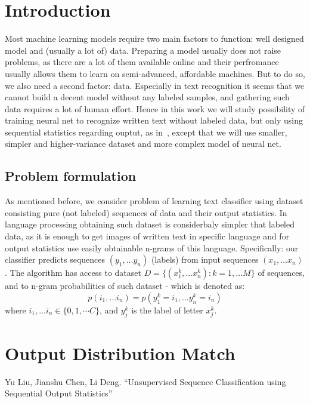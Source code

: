 \documentclass[shortabstract]{iithesis}
\author         {Grzegorz Ciesielski}
\begin{document}

\chapter{Introduction}

Most machine learning models require two main factors to function: well 
designed model and (usually a lot of) data. Preparing a model usually does not
raise problems, as there are a lot of them available online and their perfromance
usually allows them to learn on semi-advanced, affordable machines. But to do so,
we also need a second factor: data. Especially in text recognition 
it seems that we cannot build a decent model without any labeled samples, and
gathering such data requires a lot of human effort. Hence in this work we will study 
possibility of training neural net to recognize written text without labeled data, 
but only using sequential statistics regarding ouptut, as in~\cite{main_paper}, 
except that we will use smaller, simpler and higher-variance dataset and more 
complex model of neural net.

\section{Problem formulation}

As mentioned before, we consider problem of learning text classifier using dataset
consisting pure (not labeled) sequences of data and their output statistics. In 
language processing obtaining such dataset is considerbaly simpler that labeled data,
as it is enough to get images of written text in specific language and for output 
statistics use easily obtainable n-grams of this language. Specifically: our classifier
predicts sequences \( (y_1, \dots y_n) \) (labels) from input sequences \( (x_1, \dots x_n) \). The 
algorithm has access to dataset \( D = \lbrace (x_1^k, \dots x_n^k) : k = 1, \dots M \rbrace \) of
sequences, and to n-gram probabilities of such dataset - which is denoted as: 
\[ p(i_1, \dots i_n) = p(y_1^k = i_1, \dots y_n^k = i_n) \]
where \( i_1, \dots i_n \in \lbrace 0, 1, \cdots C \rbrace \), and \( y_j^k \) is the label 
of letter \( x_j^k \).



\chapter{Output Distribution Match}


\begin{thebibliography}{1}
 Yu Liu, Jianshu Chen, Li Deng. ``Unsupervised Sequence Classification using
Sequential Output Statistics''

\end{thebibliography}
\end{document}
